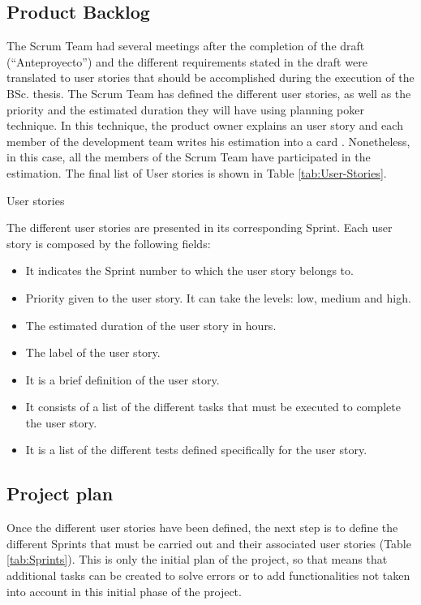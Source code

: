 \subsection{Product Backlog}
The Scrum Team had several meetings after the completion of the draft (“Anteproyecto”) and the different requirements stated in the draft were translated to user stories that should be accomplished during the execution of the BSc. thesis. The Scrum Team has defined the different user stories, as well as the priority and the estimated duration they will have using planning poker technique. In this technique, the product owner explains an user story and each member of the development team writes his estimation into a card \cite{Gar18}. Nonetheless, in this case, all the members of the Scrum Team have participated in the estimation. The final list of User stories is shown in Table \ref{tab:User-Stories}.

\begin{table}[hp]
	\centering
	{\small
		
	}
	\caption{User stories}
	\label{tab:User-Stories}
\end{table}
	
The different user stories are presented in its corresponding Sprint. Each user story is composed by the following fields:
\begin{itemize}
	\item {} It indicates the Sprint number to which the user story belongs to.
	\item {} Priority given to the user story. It can take the levels: low, medium and high.
	\item {} The estimated duration of the user story in hours. 
	\item {} The label of the user story.
	\item {} It is a brief definition of the user story.
	\item {} It consists of a list of the different tasks that must be executed to complete the user story.
	\item {} It is a list of the different tests defined specifically for the user story.
\end{itemize}

\subsection{Project plan}
Once the different user stories have been defined, the next step is to define the different Sprints that must be carried out and their associated user stories (Table \ref{tab:Sprints}). This is only the initial plan of the project, so that means that additional tasks can be created to solve errors or to add functionalities not taken into account in this initial phase of the project.

